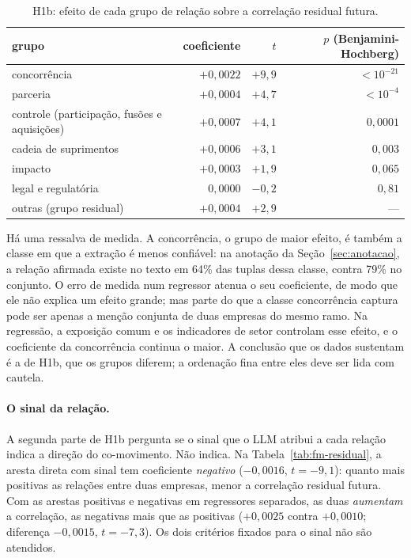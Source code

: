 \begin{table}[htbp]
\centering
\small
\caption{H1b: efeito de cada grupo de relação sobre a correlação residual futura.}
\label{tab:h1b}
\begin{tabular}{lrrr}
\toprule
grupo & coeficiente & $t$ & $p$ (Benjamini-Hochberg) \\
\midrule
concorrência & $+0{,}0022$ & $+9{,}9$ & $<10^{-21}$ \\
parceria & $+0{,}0004$ & $+4{,}7$ & $<10^{-4}$ \\
controle (participação, fusões e aquisições) & $+0{,}0007$ & $+4{,}1$ & $0{,}0001$ \\
cadeia de suprimentos & $+0{,}0006$ & $+3{,}1$ & $0{,}003$ \\
impacto & $+0{,}0003$ & $+1{,}9$ & $0{,}065$ \\
legal e regulatória & $0{,}0000$ & $-0{,}2$ & $0{,}81$ \\
outras (grupo residual) & $+0{,}0004$ & $+2{,}9$ & --- \\
\bottomrule
\end{tabular}
\end{table}

Há uma ressalva de medida. A concorrência, o grupo de maior efeito, é também a classe em que a extração é
menos confiável: na anotação da Seção~\ref{sec:anotacao}, a relação afirmada existe no texto em 64\% das
tuplas dessa classe, contra 79\% no conjunto. O erro de medida num regressor atenua o seu coeficiente,
de modo que ele não explica um efeito grande; mas parte do que a classe concorrência captura pode ser
apenas a menção conjunta de duas empresas do mesmo ramo. Na regressão, a exposição comum e os indicadores
de setor controlam esse efeito, e o coeficiente da concorrência continua o maior. A conclusão que os
dados sustentam é a de H1b, que os grupos diferem; a ordenação fina entre eles deve ser lida com cautela.

\paragraph{O sinal da relação.}
\label{sec:sinal}
A segunda parte de H1b pergunta se o sinal que o LLM atribui a cada relação indica a direção do
co-movimento. Não indica. Na Tabela~\ref{tab:fm-residual}, a aresta direta com sinal tem coeficiente
\emph{negativo} ($-0{,}0016$, $t=-9{,}1$): quanto mais positivas as relações entre duas empresas, menor a
correlação residual futura. Com as arestas positivas e negativas em
regressores separados, as duas \emph{aumentam} a correlação, as negativas mais que as positivas
($+0{,}0025$ contra $+0{,}0010$; diferença $-0{,}0015$, $t=-7{,}3$). Os dois critérios fixados para o sinal
não são atendidos.

